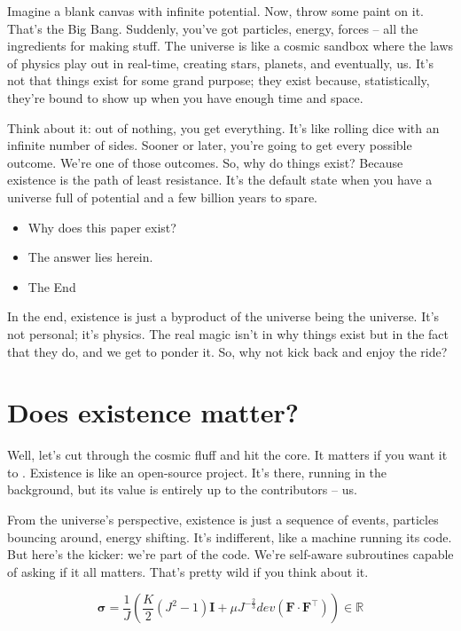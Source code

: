 \documentclass{Axon}
\begin{document}
Imagine a blank canvas with infinite potential. Now, throw some paint on it. That's the Big Bang. Suddenly, you've got particles, energy, forces – all the ingredients for making stuff. The universe is like a cosmic sandbox where the laws of physics play out in real-time, creating stars, planets, and eventually, us. It’s not that things exist for some grand purpose; they exist because, statistically, they’re bound to show up when you have enough time and space.

Think about it: out of nothing, you get everything. It's like rolling dice with an infinite number of sides. Sooner or later, you're going to get every possible outcome. We’re one of those outcomes. So, why do things exist? Because existence is the path of least resistance. It’s the default state when you have a universe full of potential and a few billion years to spare.

\begin{itemize}
    \item Why does this paper exist?
    \item The answer lies herein.
    \item The End
\end{itemize}

In the end, existence is just a byproduct of the universe being the universe. It’s not personal; it’s physics. The real magic isn't in why things exist but in the fact that they do, and we get to ponder it. So, why not kick back and enjoy the ride?
\section{Does existence matter?}
Well, let's cut through the cosmic fluff and hit the core. It matters if you want it to \cite{MALAJETMAROVA2017209}. Existence is like an open-source project. It’s there, running in the background, but its value is entirely up to the contributors – us.

From the universe's perspective, existence is just a sequence of events, particles bouncing around, energy shifting. It’s indifferent, like a machine running its code. But here’s the kicker: we’re part of the code. We’re self-aware subroutines capable of asking if it all matters. That’s pretty wild if you think about it.

\begin{equation}
    \boldsymbol{\sigma} = \frac{1}{J} \left(\frac{K}{2}(J^2-1)\boldsymbol{I}+\mu J^{-\frac{2}{3}} dev(\mathbf{F} \cdot \mathbf{F}^\intercal)\right) \in \mathbb{R}
\end{equation}
\end{document}
